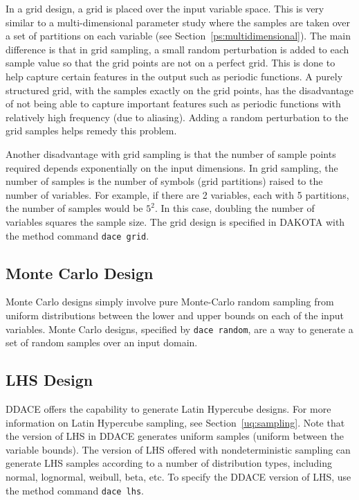 In a grid design, a grid is placed over the input variable space. 
This is very similar to a multi-dimensional parameter study where 
the samples are taken over a set of partitions on each variable 
(see Section~\ref{ps:multidimensional}).  The main difference is 
that in grid sampling, a small random perturbation is added 
to each sample value so that the grid points are not on a perfect grid. 
This is done to help capture certain features in the output such as periodic
functions. A purely structured grid, with the samples exactly on the grid 
points, has the disadvantage of not being able to capture important features 
such as periodic functions with relatively high frequency (due to aliasing). 
Adding a random perturbation to the grid samples helps remedy this problem.

Another disadvantage with grid sampling is that the number of sample points 
required depends exponentially on the input dimensions.  In grid sampling, 
the number of samples is the number of symbols (grid partitions) raised 
to the number of variables.  For example, if there are 2 variables, each 
with 5 partitions, the number of samples would be $5^2$.  In this 
case, doubling the number of variables squares the sample size. 
The grid design is specified in 
DAKOTA with the method command \texttt{dace grid}.

\subsection{Monte Carlo Design}\label{dace:mc}

Monte Carlo designs simply involve pure Monte-Carlo random sampling 
from uniform distributions between the lower and upper bounds on each 
of the input variables.  Monte Carlo designs, specified by 
\texttt{dace random}, are a way to generate a set of random samples 
over an input domain.

\subsection{LHS Design}\label{dace:lhs}

DDACE offers the capability to generate Latin Hypercube designs. 
For more information on Latin Hypercube sampling, see 
Section~\ref{uq:sampling}.  Note that the version of LHS in DDACE 
generates uniform samples (uniform between the variable bounds). 
The version of LHS offered with nondeterministic sampling can generate 
LHS samples according to a number of distribution types, including 
normal, lognormal, weibull, beta, etc. To specify the DDACE version 
of LHS, use the method command \texttt{dace lhs}.


